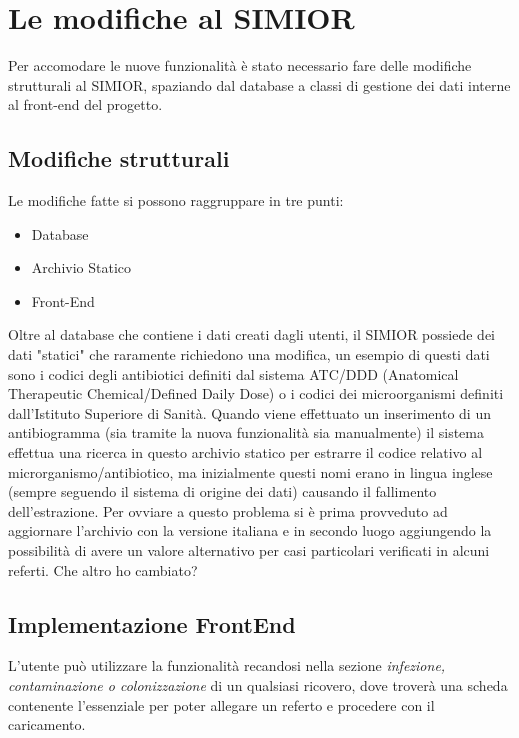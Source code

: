 \chapter{Le modifiche al SIMIOR}
Per accomodare le nuove funzionalità è stato necessario fare delle modifiche strutturali al SIMIOR, spaziando dal database a classi di gestione dei dati interne al front-end del progetto.
\section{Modifiche strutturali}
Le modifiche fatte si possono raggruppare in tre punti:
\begin{itemize}
	\item Database
	\item Archivio Statico
	\item Front-End
\end{itemize}
Oltre al database che contiene i dati creati dagli utenti, il SIMIOR possiede dei dati "statici" che raramente richiedono una modifica, un esempio di questi dati sono i codici degli antibiotici definiti dal sistema ATC/DDD (Anatomical Therapeutic Chemical/Defined Daily Dose) o i codici dei microorganismi definiti dall'Istituto Superiore di Sanità.
Quando viene effettuato un inserimento di un antibiogramma (sia tramite la nuova funzionalità sia manualmente) il sistema effettua una ricerca in questo archivio statico per estrarre il codice relativo al microrganismo/antibiotico, ma inizialmente questi nomi erano in lingua inglese (sempre seguendo il sistema di origine dei dati) causando il fallimento dell'estrazione. Per ovviare a questo problema si è prima provveduto ad aggiornare l'archivio con la versione italiana e in secondo luogo aggiungendo la possibilità di avere un valore alternativo per casi particolari verificati in alcuni referti.
Che altro ho cambiato?
\newpage
\section{Implementazione FrontEnd}
L'utente può utilizzare la funzionalità recandosi nella sezione \textit{infezione, contaminazione o colonizzazione} di un qualsiasi ricovero, dove troverà una scheda contenente l'essenziale per poter allegare un referto e procedere con il caricamento.
